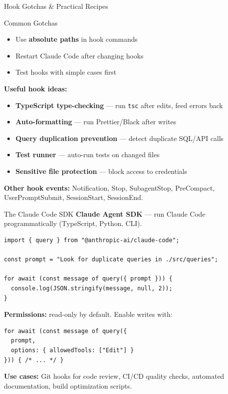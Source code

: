 \documentclass[aspectratio=169]{beamer}
\begin{document}
\begin{frame}{Hook Gotchas \& Practical Recipes}
\begin{alertblock}{Common Gotchas}
\begin{itemize}\setlength\itemsep{0em}
  \item Use \textbf{absolute paths} in hook commands
  \item Restart Claude Code after changing hooks
  \item Test hooks with simple cases first
\end{itemize}
\end{alertblock}

\smallskip
\small
\textbf{Useful hook ideas:}
\begin{itemize}\setlength\itemsep{0em}
  \item \textbf{TypeScript type-checking} --- run \texttt{tsc} after edits, feed errors back
  \item \textbf{Auto-formatting} --- run Prettier/Black after writes
  \item \textbf{Query duplication prevention} --- detect duplicate SQL/API calls
  \item \textbf{Test runner} --- auto-run tests on changed files
  \item \textbf{Sensitive file protection} --- block access to credentials
\end{itemize}

\smallskip
\footnotesize
\textbf{Other hook events:} Notification, Stop, SubagentStop, PreCompact, UserPromptSubmit, SessionStart, SessionEnd.
\end{frame}

\begin{frame}[fragile]{The Claude Code SDK}
\textbf{Claude Agent SDK} --- run Claude Code programmatically (TypeScript, Python, CLI).

\begin{lstlisting}[]
import { query } from "@anthropic-ai/claude-code";

const prompt = "Look for duplicate queries in ./src/queries";

for await (const message of query({ prompt })) {
  console.log(JSON.stringify(message, null, 2));
}
\end{lstlisting}

\textbf{Permissions:} read-only by default. Enable writes with:
\begin{lstlisting}[]
for await (const message of query({
  prompt,
  options: { allowedTools: ["Edit"] }
})) { /* ... */ }
\end{lstlisting}

\smallskip
\textbf{Use cases:} Git hooks for code review, CI/CD quality checks, automated documentation, build optimization scripts.
\end{frame}
\end{document}
